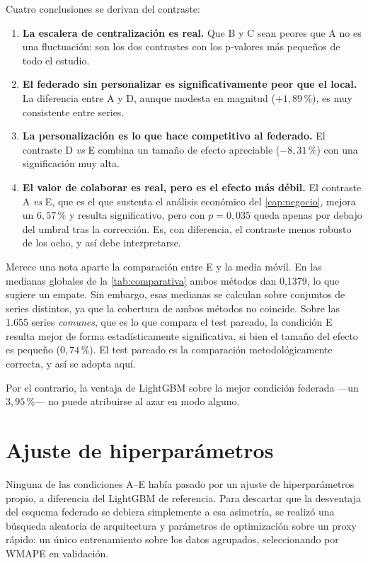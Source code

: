 Cuatro conclusiones se derivan del contraste:

\begin{enumerate}
  \item \textbf{La escalera de centralización es real.} Que B y C sean peores que A no es una
    fluctuación: son los dos contrastes con los p-valores más pequeños de todo el estudio.

  \item \textbf{El federado sin personalizar es significativamente peor que el local.} La
    diferencia entre A y D, aunque modesta en magnitud ($+1{,}89\,\%$), es muy consistente entre
    series.

  \item \textbf{La personalización es lo que hace competitivo al federado.} El contraste D \emph{vs}
    E combina un tamaño de efecto apreciable ($-8{,}31\,\%$) con una significación muy alta.

  \item \textbf{El valor de colaborar es real, pero es el efecto más débil.} El contraste A
    \emph{vs} E, que es el que sustenta el análisis económico del \cref{cap:negocio}, mejora un
    $6{,}57\,\%$ y resulta significativo, pero con $p = 0{,}035$ queda apenas por debajo del umbral
    tras la corrección. Es, con diferencia, el contraste menos robusto de los ocho, y así debe
    interpretarse.
\end{enumerate}

Merece una nota aparte la comparación entre E y la media móvil. En las medianas globales de la
\cref{tab:comparativa} ambos métodos dan 0,1379, lo que sugiere un empate. Sin embargo, esas
medianas se calculan sobre conjuntos de series distintos, ya que la cobertura de ambos métodos no
coincide. Sobre las 1.655 series \emph{comunes}, que es lo que compara el test pareado, la
condición E resulta mejor de forma estadísticamente significativa, si bien el tamaño del efecto es
pequeño ($0{,}74\,\%$). El test pareado es la comparación metodológicamente correcta, y así se
adopta aquí.

Por el contrario, la ventaja de LightGBM sobre la mejor condición federada —un $3{,}95\,\%$— no
puede atribuirse al azar en modo alguno.

\section{Ajuste de hiperparámetros}

Ninguna de las condiciones A–E había pasado por un ajuste de hiperparámetros propio, a diferencia
del LightGBM de referencia. Para descartar que la desventaja del esquema federado se debiera
simplemente a esa asimetría, se realizó una búsqueda aleatoria de arquitectura y parámetros de
optimización sobre un proxy rápido: un único entrenamiento sobre los datos agrupados, seleccionando
por WMAPE en validación.

